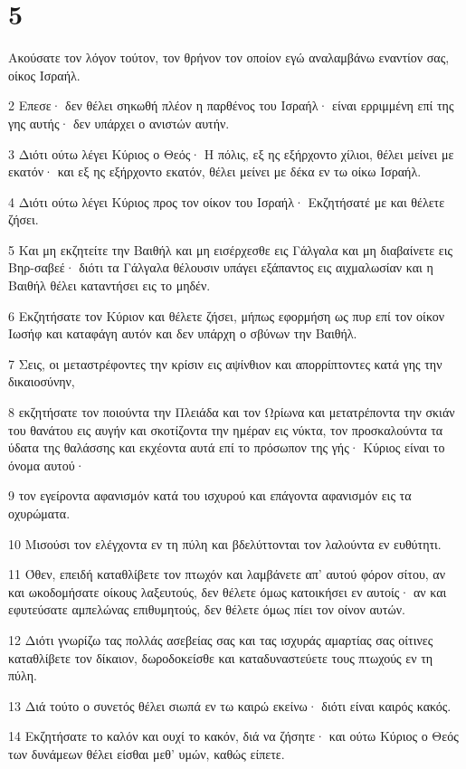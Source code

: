 \chapter{5}

\par Ακούσατε τον λόγον τούτον, τον θρήνον τον οποίον εγώ αναλαμβάνω εναντίον σας, οίκος Ισραήλ.
\par 2 Επεσε· δεν θέλει σηκωθή πλέον η παρθένος του Ισραήλ· είναι ερριμμένη επί της γης αυτής· δεν υπάρχει ο ανιστών αυτήν.
\par 3 Διότι ούτω λέγει Κύριος ο Θεός· Η πόλις, εξ ης εξήρχοντο χίλιοι, θέλει μείνει με εκατόν· και εξ ης εξήρχοντο εκατόν, θέλει μείνει με δέκα εν τω οίκω Ισραήλ.
\par 4 Διότι ούτω λέγει Κύριος προς τον οίκον του Ισραήλ· Εκζητήσατέ με και θέλετε ζήσει.
\par 5 Και μη εκζητείτε την Βαιθήλ και μη εισέρχεσθε εις Γάλγαλα και μη διαβαίνετε εις Βηρ-σαβεέ· διότι τα Γάλγαλα θέλουσιν υπάγει εξάπαντος εις αιχμαλωσίαν και η Βαιθήλ θέλει καταντήσει εις το μηδέν.
\par 6 Εκζητήσατε τον Κύριον και θέλετε ζήσει, μήπως εφορμήση ως πυρ επί τον οίκον Ιωσήφ και καταφάγη αυτόν και δεν υπάρχη ο σβύνων την Βαιθήλ.
\par 7 Σεις, οι μεταστρέφοντες την κρίσιν εις αψίνθιον και απορρίπτοντες κατά γης την δικαιοσύνην,
\par 8 εκζητήσατε τον ποιούντα την Πλειάδα και τον Ωρίωνα και μετατρέποντα την σκιάν του θανάτου εις αυγήν και σκοτίζοντα την ημέραν εις νύκτα, τον προσκαλούντα τα ύδατα της θαλάσσης και εκχέοντα αυτά επί το πρόσωπον της γής· Κύριος είναι το όνομα αυτού·
\par 9 τον εγείροντα αφανισμόν κατά του ισχυρού και επάγοντα αφανισμόν εις τα οχυρώματα.
\par 10 Μισούσι τον ελέγχοντα εν τη πύλη και βδελύττονται τον λαλούντα εν ευθύτητι.
\par 11 Όθεν, επειδή καταθλίβετε τον πτωχόν και λαμβάνετε απ' αυτού φόρον σίτου, αν και ωκοδομήσατε οίκους λαξευτούς, δεν θέλετε όμως κατοικήσει εν αυτοίς· αν και εφυτεύσατε αμπελώνας επιθυμητούς, δεν θέλετε όμως πίει τον οίνον αυτών.
\par 12 Διότι γνωρίζω τας πολλάς ασεβείας σας και τας ισχυράς αμαρτίας σας οίτινες καταθλίβετε τον δίκαιον, δωροδοκείσθε και καταδυναστεύετε τους πτωχούς εν τη πύλη.
\par 13 Διά τούτο ο συνετός θέλει σιωπά εν τω καιρώ εκείνω· διότι είναι καιρός κακός.
\par 14 Εκζητήσατε το καλόν και ουχί το κακόν, διά να ζήσητε· και ούτω Κύριος ο Θεός των δυνάμεων θέλει είσθαι μεθ' υμών, καθώς είπετε.
